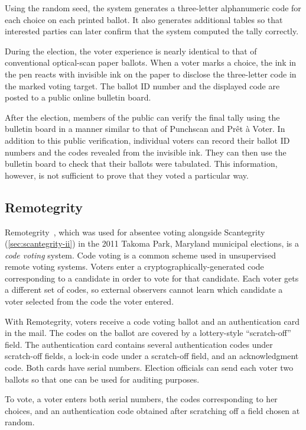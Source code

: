 Using the random seed, the system generates a three-letter
alphanumeric code for each choice on each printed ballot. It also
generates additional tables so that interested parties can later
confirm that the system computed the tally correctly.

During the election, the voter experience is nearly identical to that
of conventional optical-scan paper ballots. When a voter marks a
choice, the ink in the pen reacts with invisible ink on the paper to
disclose the three-letter code in the marked voting target. The ballot
ID number and the displayed code are posted to a public
online bulletin board.

After the election, members of the public can verify the final tally
using the bulletin board in a manner similar to that of Punchscan and
Prêt à Voter. In addition to this public verification, individual
voters can record their ballot ID numbers and the codes revealed from
the invisible ink. They can then use the bulletin board to check that
their ballots were tabulated. This information, however, is not
sufficient to prove that they voted a particular way.

\subsection{Remotegrity}
\label{sec:remotegrity}
Remotegrity~\cite{zagorski2013}, which was used for absentee voting
alongside Scantegrity (\autoref{sec:scantegrity-ii}) in the 2011
Takoma Park, Maryland municipal elections, is a \emph{code voting}
system.  Code voting is a common scheme used in unsupervised remote
voting systems.  Voters enter a cryptographically-generated code
corresponding to a candidate in order to vote for that candidate. Each
voter gets a different set of codes, so external observers cannot
learn which candidate a voter selected from the code the voter
entered.

With Remotegrity, voters receive a code voting ballot and an
authentication card in the mail. The codes on the ballot are covered
by a lottery-style ``scratch-off'' field. The authentication card
contains several authentication codes under scratch-off fields, a
lock-in code under a scratch-off field, and an acknowledgment
code. Both cards have serial numbers. Election officials can send each
voter two ballots so that one can be used for auditing purposes.

To vote, a voter enters both serial numbers, the codes corresponding
to her choices, and an authentication code obtained after scratching
off a field chosen at random.

